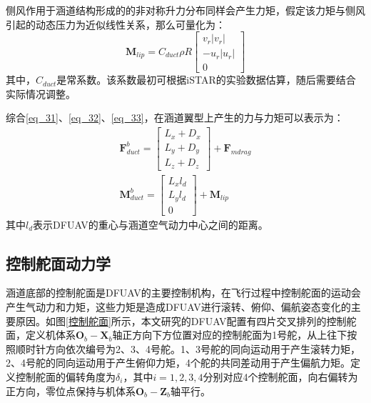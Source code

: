 侧风作用于涵道结构形成的的非对称升力分布同样会产生力矩，假定该力矩与侧风引起的动态压力为近似线性关系，那么可量化为：
\begin{equation}
    \boldsymbol{M}_{lip}=C_{duct}\rho{R}
    \begin{bmatrix}v_r|v_r| \\-u_r|u_r| \\0\end{bmatrix}
    \label{eq_33}
\end{equation}
其中，$C_{duct}$是常系数。该系数最初可根据iSTAR\cite{flemingImprovingControlSystem}的实验数据估算，随后需要结合实际情况调整。

综合\eqref{eq_31}、\eqref{eq_32}、\eqref{eq_33}，在涵道翼型上产生的力与力矩可以表示为\cite{johnsonModelingControlFlight2006b,choiStaticAnalysisSmall2012}：
\begin{align}
    \boldsymbol{F}_{duct}^b=
    \begin{bmatrix}
    L_x+D_x \\
    L_y+D_y \\
    L_z+D_z
    \end{bmatrix}+\boldsymbol{F} _{mdrag}\label{eq_33.5}\\
    \boldsymbol{M}_{duct}^b=
    \begin{bmatrix}
    L_xl_d \\
    L_yl_d \\
    0
    \end{bmatrix}+\boldsymbol{M}_{lip}
    \label{eq_34}
\end{align}
其中$l_d$表示DFUAV的重心与涵道空气动力中心之间的距离。

\subsection{控制舵面动力学}

涵道底部的控制舵面是DFUAV的主要控制机构，在飞行过程中控制舵面的运动会产生气动力和力矩，这些力矩是造成DFUAV进行滚转、俯仰、偏航姿态变化的主要原因。如图\ref{控制舵面}所示，本文研究的DFUAV配置有四片交叉排列的控制舵面，定义机体系${\boldsymbol{O}_b}-{\boldsymbol{X}_b}$轴正方向下方位置对应的控制舵面为1号舵，从上往下按照顺时针方向依次编号为2、3、4号舵。1、3号舵的同向运动用于产生滚转力矩，2、4号舵的同向运动用于产生俯仰力矩，4个舵的共同差动用于产生偏航力矩。定义控制舵面的偏转角度为$\delta_i$，其中$i=1,2,3,4$分别对应4个控制舵面，向右偏转为正方向，零位点保持与机体系${\boldsymbol{O}_b}-{\boldsymbol{Z}_b}$轴平行。

